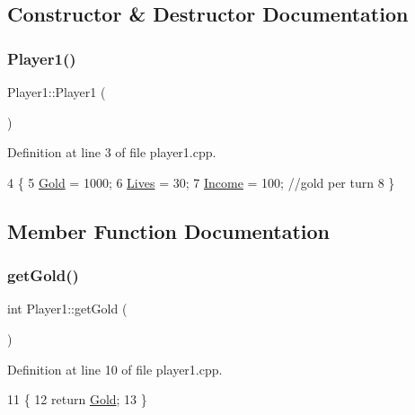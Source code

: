 \subsection{Constructor \& Destructor Documentation}
\mbox{\label{class_player1_a412188402865939ebc4e2aa1e5a214a2}} 
\subsubsection{\texorpdfstring{Player1()}{Player1()}}
{\footnotesize\ttfamily Player1\+::\+Player1 (\begin{DoxyParamCaption}{ }\end{DoxyParamCaption})}



Definition at line 3 of file player1.\+cpp.


\begin{DoxyCode}
4 \{
5     \hyperlink{class_player1_ab390478b345e443398bac442a04b675c}{Gold} = 1000;
6     \hyperlink{class_player1_aacba034528d5c9fdefa4f246fe526a38}{Lives} = 30;
7     \hyperlink{class_player1_a414fae948c79246f6a98554718f0cd99}{Income} = 100; \textcolor{comment}{//gold per turn}
8 \}
\end{DoxyCode}


\subsection{Member Function Documentation}
\mbox{\label{class_player1_a9395a16fecb7b96395455f096ac1b60b}} 
\subsubsection{\texorpdfstring{get\+Gold()}{getGold()}}
{\footnotesize\ttfamily int Player1\+::get\+Gold (\begin{DoxyParamCaption}{ }\end{DoxyParamCaption})}



Definition at line 10 of file player1.\+cpp.


\begin{DoxyCode}
11 \{
12     \textcolor{keywordflow}{return} \hyperlink{class_player1_ab390478b345e443398bac442a04b675c}{Gold};
13 \}
\end{DoxyCode}
\mbox{\label{class_player1_a1bc2927827b94667b6f2d115ae95fb75}} 
